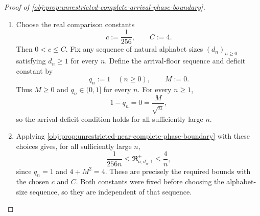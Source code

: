 \documentclass[11pt]{article}
\begin{document}
\begin{proof}[Proof of \cref{obj:prop:unrestricted-complete-arrival-phase-boundary}]
\begin{enumerate}
\item Choose the real comparison constants
\[
c:=\frac{1}{256},
\qquad C:=4.
\]
Then \(0<c\le C\). Fix any sequence of natural alphabet sizes \((d_n)_{n\ge0}\) satisfying \(d_n\ge1\) for every \(n\). Define the arrival-floor sequence and deficit constant by
\[
q_n:=1\quad(n\ge0),
\qquad M:=0.
\]
Thus \(M\ge0\) and \(q_n\in(0,1]\) for every \(n\). For every \(n\ge1\),
\[
1-q_n=0=\frac{M}{\sqrt n},
\]
so the arrival-deficit condition holds for all sufficiently large \(n\).

\item Applying \cref{obj:prop:unrestricted-near-complete-phase-boundary} with these choices gives, for all sufficiently large \(n\),
\[
\frac{1}{256n}
\le \mathfrak R^{+}_{n,d_n,1}
\le \frac{4}{n},
\]
since \(q_n=1\) and \(4+M^2=4\). These are precisely the required bounds with the chosen \(c\) and \(C\). Both constants were fixed before choosing the alphabet-size sequence, so they are independent of that sequence.
\end{enumerate}
\end{proof}
\end{document}
